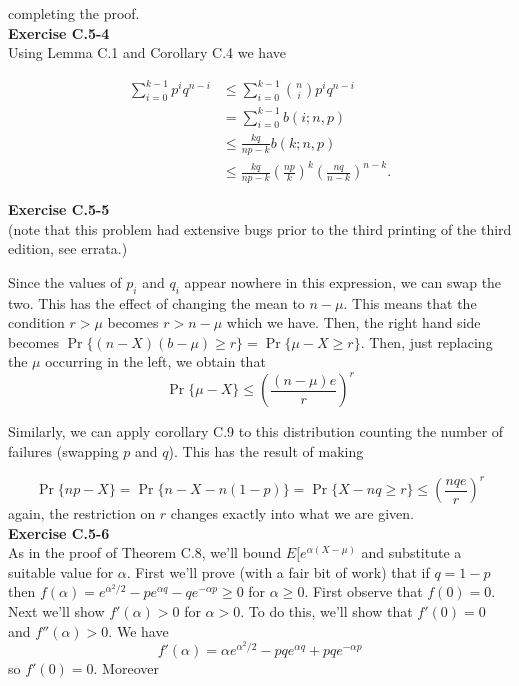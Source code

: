 \documentclass{article}
\begin{document}
completing the proof.\\

\noindent\textbf{Exercise C.5-4}\\

Using Lemma C.1 and Corollary C.4 we have 

\begin{align*} 
\sum_{i=0}^{k-1} p^iq^{n-i} &\leq \sum_{i=0}^{k-1} {n \choose i}p^iq^{n-i} \\
&= \sum_{i=0}^{k-1}b(i;n,p) \\
&\leq \frac{kq}{np-k}b(k;n,p) \\
&\leq \frac{kq}{np-k}\left(\frac{np}{k}\right)^k \left(\frac{nq}{n-k}\right)^{n-k}.
\end{align*}

\noindent\textbf{Exercise C.5-5}\\

(note that this problem had extensive bugs prior to the third printing of the third edition, see errata.)

Since the values of $p_i$ and $q_i$ appear nowhere in this expression, we can swap the two. This has the effect of changing the mean to $n-\mu$. This means that the condition $r>\mu$ becomes $r > n-\mu$ which we have. Then, the right hand side becomes $\Pr\{(n-X) (b-\mu)\ge r\} = \Pr\{\mu-X \ge r\}$. Then, just replacing the $\mu$ occurring in the left, we obtain that
\[
\Pr\{\mu- X\} \le \left(\frac{(n-\mu)e}{r}\right)^r
\]

Similarly, we can apply corollary C.9 to this distribution counting the number of failures (swapping $p$ and $q$). This has the result of making

\[
\Pr\{ np -X\} =  \Pr\{ n - X - n(1-p)\} = \Pr\{X - nq\ge r\}   \le \left(\frac{nqe}{r}\right)^r
\]
again, the restriction on $r$ changes exactly into what we are given.\\

\noindent\textbf{Exercise C.5-6}\\

As in the proof of Theorem C.8, we'll bound $E[e^{\alpha(X-\mu)}$ and substitute a suitable value for $\alpha$.  First we'll prove (with a fair bit of work) that if $q = 1-p$ then $f(\alpha) = e^{\alpha^2/2} - pe^{\alpha q} - qe^{-\alpha p} \geq 0$ for $\alpha \geq 0$.  First observe that $f(0) = 0$.  Next we'll show $f'(\alpha) > 0$ for $\alpha > 0$.  To do this, we'll show that $f'(0) = 0$ and $f''(\alpha) > 0$.  We have
\[f'(\alpha) = \alpha e^{\alpha^2/2} - pqe^{\alpha q} + pqe^{-\alpha p} \]
so $f'(0) = 0$.  Moreover
\end{document}
